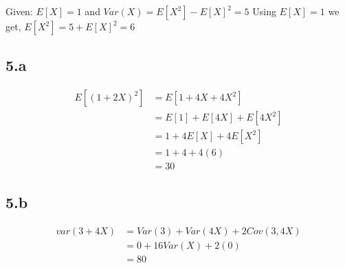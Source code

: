 \documentclass[a4paper]{article}
\begin{document}
Given: $E[X]=1$ and $Var(X)=E[X^2]-E[X]^2 = 5$
Using $E[X]=1$ we get, $E[X^2]=5+E[X]^2=6$

\subsection*{5.a}

\begin{align*}
E[(1+2X)^2] &= E[1+4X+4X^2]\\
&= E[1]+E[4X]+E[4X^2]\\
&= 1+4E[X]+4E[X^2]\\
&= 1+4+4(6)\\
&= 30
\end{align*}

\subsection*{5.b}
\begin{align*}
var(3+4X) &= Var(3) + Var(4X) + 2Cov(3,4X)\\
&= 0 + 16Var(X) + 2(0)\\
&= 80
\end{align*}
\end{document}
